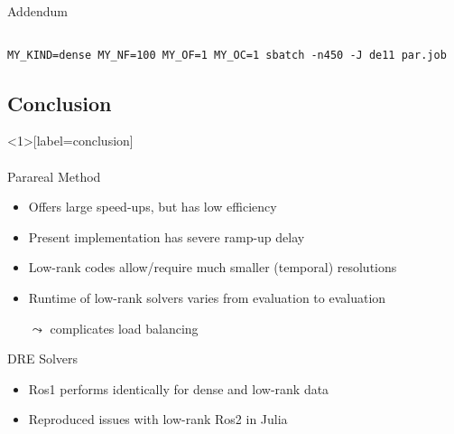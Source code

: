 \begin{frame}[b,fragile,label=speedup]{\secname}
\begin{columns}[c,onlytextwidth]
\begin{block}{Addendum}
\begin{itemize}
  \end{itemize}
  \end{block}
  {\hfill\hyperlink{app:rail1357}{}}
  \vspace{-\baselineskip}
  \end{columns}
  \onslide
  \vfill
  \begin{lstlisting}
MY_KIND=dense MY_NF=100 MY_OF=1 MY_OC=1 sbatch -n450 -J de11 par.job
  \end{lstlisting}
\end{frame}

\subsection{Conclusion}

\begin{frame}<1>[label=conclusion]{\secname}
\framesubtitle{\subsecname}
\begin{block}{Parareal Method}
  \begin{itemize}
    \item
      Offers large speed-ups, but has low efficiency
    \item
      Present implementation has severe ramp-up delay

    \item
      Low-rank codes allow/require much smaller (temporal) resolutions

    \item
      Runtime of low-rank solvers varies from evaluation to evaluation

      $\leadsto$ complicates load balancing
  \end{itemize}
\end{block}
\begin{block}{DRE Solvers}
  \begin{itemize}
    \item
      Ros1 performs identically for dense and low-rank data
    \item
      Reproduced issues with low-rank Ros2 in Julia

  \end{itemize}
\end{block}
\end{frame}

